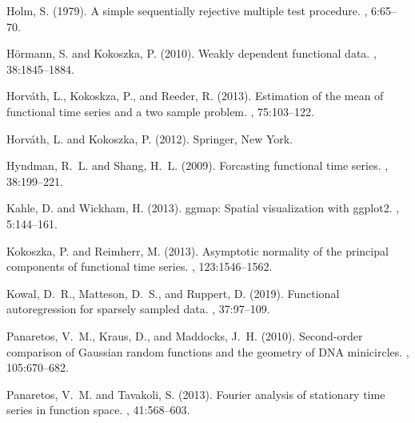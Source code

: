 \documentclass[11pt]{article}
\numberwithin{equation}{section}
\numberwithin{theorem}{section}
\numberwithin{lemma}{section}
\numberwithin{proposition}{section}
\numberwithin{cor}{section}
\numberwithin{definition}{section}
\numberwithin{cons}{section}
\numberwithin{rem}{section}
\numberwithin{exa}{section}
\numberwithin{table}{section}
\numberwithin{figure}{section}
\numberwithin{algo}{section}
\begin{document}
{{\begin{thebibliography}{}
Holm, S. (1979).
\newblock A simple sequentially rejective multiple test procedure.
, 6:65--70.

H{\"o}rmann, S. and Kokoszka, P. (2010).
\newblock Weakly dependent functional data.
, 38:1845--1884.

Horv\'ath, L., Kokoskza, P., and Reeder, R. (2013).
\newblock Estimation of the mean of functional time series and a two sample
  problem.
,
  75:103--122.

Horv{\'{a}}th, L. and Kokoszka, P. (2012).
\newblock Springer, New York.

Hyndman, R.~L. and Shang, H.~L. (2009).
\newblock Forcasting functional time series.
, 38:199--221.

Kahle, D. and Wickham, H. (2013).
\newblock ggmap: Spatial visualization with ggplot2.
, 5:144--161.

Kokoszka, P. and Reimherr, M. (2013).
\newblock Asymptotic normality of the principal components of functional time
  series.
, 123:1546--1562.

Kowal, D.~R., Matteson, D.~S., and Ruppert, D. (2019).
\newblock Functional autoregression for sparsely sampled data.
, 37:97--109.

Panaretos, V.~M., Kraus, D., and Maddocks, J.~H. (2010).
\newblock Second-order comparison of {G}aussian random functions and the
  geometry of {DNA} minicircles.
, 105:670--682.

Panaretos, V.~M. and Tavakoli, S. (2013).
\newblock Fourier analysis of stationary time series in function space.
, 41:568--603.


\end{thebibliography}}}
\end{document}
